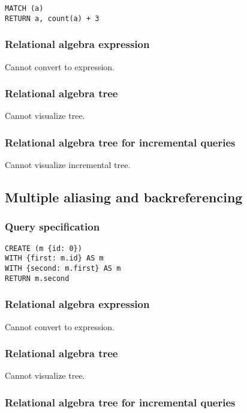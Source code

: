 \begin{lstlisting}
MATCH (a)
RETURN a, count(a) + 3
\end{lstlisting}

\subsubsection*{Relational algebra expression}

Cannot convert to expression.

\subsubsection*{Relational algebra tree}

Cannot visualize tree.

\subsubsection*{Relational algebra tree for incremental queries}

Cannot visualize incremental tree.

\subsection{Multiple aliasing and backreferencing}

\subsubsection*{Query specification}

\begin{lstlisting}
CREATE (m {id: 0})
WITH {first: m.id} AS m
WITH {second: m.first} AS m
RETURN m.second
\end{lstlisting}

\subsubsection*{Relational algebra expression}

Cannot convert to expression.

\subsubsection*{Relational algebra tree}

Cannot visualize tree.

\subsubsection*{Relational algebra tree for incremental queries}

